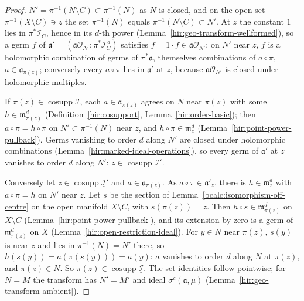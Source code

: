 \begin{proof}
\mixedleanok
\(N'=\overline{\pi^{-1}(N\setminus C)}\subset\pi^{-1}(N)\) as \(N\) is closed, and on the open set \(\pi^{-1}(X\setminus C)\ni z\) the set \(\pi^{-1}(N)\) equals
\(\pi^{-1}(N\setminus C)\subset N'\). At \(z\) the constant \(1\) lies in \(\pi^*\mathcal I_C\), hence in its \(d\)-th power
(Lemma~\ref{hir:geo-transform-wellformed}), so a germ \(f\) of \(\mathfrak a'=(\mathfrak a\mathcal O_{N'}:\pi^*\mathcal I_C^{\,d})\) satisfies \(f=1\cdot f\in\mathfrak a\mathcal O_{N'}\): on
\(N'\) near \(z\), \(f\) is a holomorphic combination of germs of \(\pi^*\mathfrak a\), themselves combinations of \(a\circ\pi\), \(a\in\mathfrak a_{\pi(z)}\);
conversely every \(a\circ\pi\) lies in \(\mathfrak a'\) at \(z\), because \(\mathfrak a\mathcal O_{N'}\) is closed under holomorphic multiples.

If \(\pi(z)\in\operatorname{cosupp}\underline{\mathcal I}\), each \(a\in\mathfrak a_{\pi(z)}\) agrees on \(N\) near \(\pi(z)\) with some \(h\in\mathfrak m_{\pi(z)}^d\)
(Definition~\ref{hir:cosupport}, Lemma~\ref{hir:order-basic}); then \(a\circ\pi=h\circ\pi\) on \(N'\subset\pi^{-1}(N)\) near \(z\), and
\(h\circ\pi\in\mathfrak m_z^d\) (Lemma~\ref{hir:point-power-pullback}). Germs vanishing to order \(d\) along \(N'\) are closed under holomorphic combinations
(Lemma~\ref{hir:marked-ideal-operations}), so every germ of \(\mathfrak a'\) at \(z\) vanishes to order \(d\) along \(N'\): \(z\in\operatorname{cosupp}\underline{\mathcal I}'\).

Conversely let \(z\in\operatorname{cosupp}\underline{\mathcal I}'\) and \(a\in\mathfrak a_{\pi(z)}\). As \(a\circ\pi\in\mathfrak a'_z\), there is \(h\in\mathfrak m_z^d\) with
\(a\circ\pi=h\) on \(N'\) near \(z\). Let \(s\) be the section of Lemma~\ref{bcalc:isomorphism-off-centre} on the open manifold \(X\setminus C\), with
\(s(\pi(z))=z\). Then \(h\circ s\in\mathfrak m_{\pi(z)}^d\) on \(X\setminus C\) (Lemma~\ref{hir:point-power-pullback}), and its extension by zero is a germ of
\(\mathfrak m_{\pi(z)}^d\) on \(X\) (Lemma~\ref{hir:open-restriction-ideal}). For \(y\in N\) near \(\pi(z)\), \(s(y)\) is near \(z\) and lies in
\(\pi^{-1}(N)=N'\) there, so \(h(s(y))=a(\pi(s(y)))=a(y)\): \(a\) vanishes to order \(d\) along \(N\) at \(\pi(z)\), and \(\pi(z)\in N\). So
\(\pi(z)\in\operatorname{cosupp}\underline{\mathcal I}\). The set identities follow pointwise; for \(N=M\) the transform has \(N'=M'\) and ideal
\(\sigma^{c}(\mathfrak a,\mu)\) (Lemma~\ref{hir:geo-transform-ambient}).
\end{proof}


